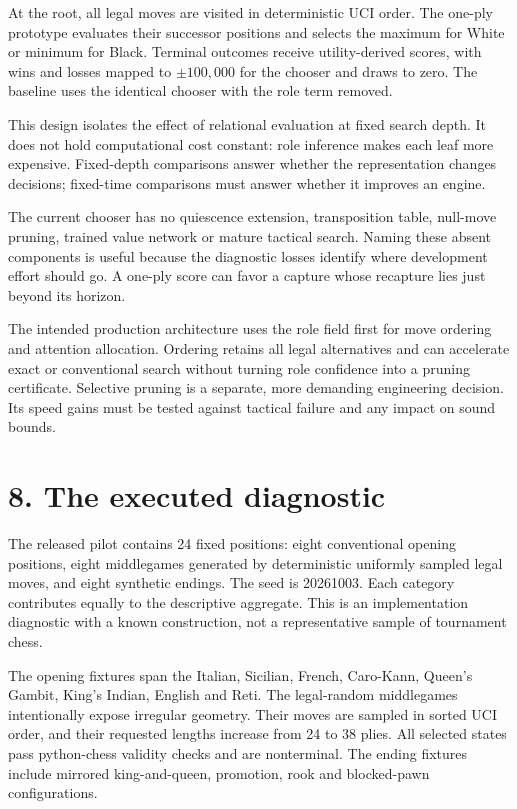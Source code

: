 \documentclass[10pt]{article}
\begin{document}
At the root, all legal moves are visited in deterministic UCI order. The one-ply prototype evaluates their successor positions and selects the maximum for White or minimum for Black. Terminal outcomes receive utility-derived scores, with wins and losses mapped to $\pm100{,}000$ for the chooser and draws to zero. The baseline uses the identical chooser with the role term removed.

This design isolates the effect of relational evaluation at fixed search depth. It does not hold computational cost constant: role inference makes each leaf more expensive. Fixed-depth comparisons answer whether the representation changes decisions; fixed-time comparisons must answer whether it improves an engine.

The current chooser has no quiescence extension, transposition table, null-move pruning, trained value network or mature tactical search. Naming these absent components is useful because the diagnostic losses identify where development effort should go. A one-ply score can favor a capture whose recapture lies just beyond its horizon.

The intended production architecture uses the role field first for move ordering and attention allocation. Ordering retains all legal alternatives and can accelerate exact or conventional search without turning role confidence into a pruning certificate. Selective pruning is a separate, more demanding engineering decision. Its speed gains must be tested against tactical failure and any impact on sound bounds.

\clearpage
\section*{8. The executed diagnostic}
The released pilot contains 24 fixed positions: eight conventional opening positions, eight middlegames generated by deterministic uniformly sampled legal moves, and eight synthetic endings. The seed is 20261003. Each category contributes equally to the descriptive aggregate. This is an implementation diagnostic with a known construction, not a representative sample of tournament chess.

The opening fixtures span the Italian, Sicilian, French, Caro-Kann, Queen's Gambit, King's Indian, English and Reti. The legal-random middlegames intentionally expose irregular geometry. Their moves are sampled in sorted UCI order, and their requested lengths increase from 24 to 38 plies. All selected states pass python-chess validity checks and are nonterminal. The ending fixtures include mirrored king-and-queen, promotion, rook and blocked-pawn configurations.
\end{document}
